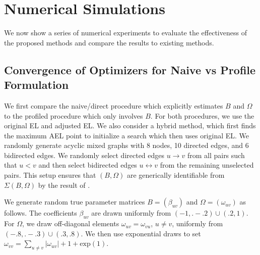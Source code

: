 \documentclass[notitlepage]{article}
\begin{document}
\section{Numerical Simulations} \label{sec:simulations}
We now show a series of numerical experiments to evaluate the effectiveness of the proposed methods and compare the results to existing methods.

\subsection{Convergence of Optimizers for Naive vs Profile Formulation}\label{sec:naiveProf}
We first compare the naive/direct procedure which explicitly estimates
$B$ and $\Omega$ to the profiled procedure which only involves
$B$. For both procedures, we use the original EL and adjusted EL.  We
also consider a hybrid method, which first finds the maximum AEL point
to initialize a search which then uses original EL. We randomly
generate acyclic mixed graphs with 8 nodes, 10 directed edges, and 6
bidirected edges. We randomly select directed edges $u \rightarrow v$
from all pairs such that $u < v$ and then select bidirected edges
$u \leftrightarrow v$ from the remaining unselected pairs.  This setup
ensures that $(B,\Omega)$ are generically identifiable from
$\Sigma(B,\Omega)$ by the result of \cite{brito:2002}.

We generate random true parameter matrices $B=(\beta_{uv})$ and
$\Omega=(\omega_{uv})$ as follows.  The coefficients $\beta_{uv}$ are
drawn uniformly from $(-1, .-.2) \cup (.2, 1)$.  For $\Omega$, we draw
off-diagonal elements $\omega_{uv} = \omega_{vu}$, $u\not=v$,
uniformly from $(-.8, .-.3) \cup (.3, .8)$.  We then use exponential
draws to set
$\omega_{vv} = \sum_{u \neq v} |\omega_{uv}| + 1 + \text{exp}(1)$.
\end{document}
